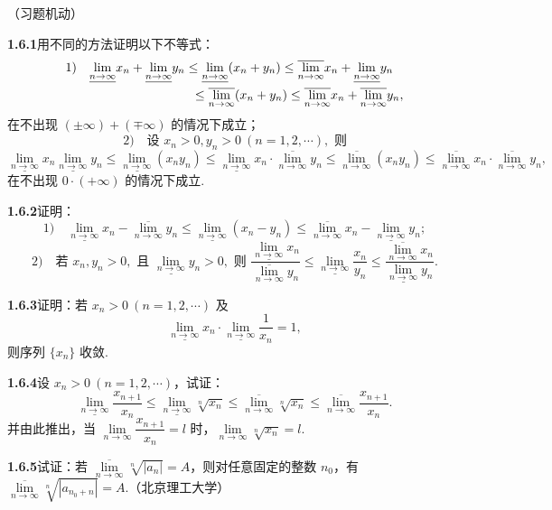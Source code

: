 \documentclass[UTF8,12pt,a4paper,fontset=fandol]{ctexart}
\begin{document}
（习题机动）

\noindent\textbf{1.6.1}\quad 用不同的方法证明以下不等式：
\[
\begin{aligned}
  &1)\quad
  \underline{\lim_{n\to\infty}}x_n+\underline{\lim_{n\to\infty}}y_n
  \le \underline{\lim_{n\to\infty}}(x_n+y_n)
  \le \overline{\lim_{n\to\infty}}x_n+\underline{\lim_{n\to\infty}}y_n\\
  &\hspace{35mm}\le \overline{\lim_{n\to\infty}}(x_n+y_n)
  \le \overline{\lim_{n\to\infty}}x_n+\overline{\lim_{n\to\infty}}y_n,
\end{aligned}
\]
在不出现 $(\pm\infty)+(\mp\infty)$ 的情况下成立；
\[
  2)\quad \text{设 }x_n>0,y_n>0\ (n=1,2,\cdots),\text{ 则}
\]
\[
  \underline{\lim_{n\to\infty}}x_n\underline{\lim_{n\to\infty}}y_n
  \le \underline{\lim_{n\to\infty}}(x_ny_n)
  \le \underline{\lim_{n\to\infty}}x_n\cdot\overline{\lim_{n\to\infty}}y_n
  \le \overline{\lim_{n\to\infty}}(x_ny_n)
  \le \overline{\lim_{n\to\infty}}x_n\cdot\overline{\lim_{n\to\infty}}y_n,
\]
在不出现 $0\cdot(+\infty)$ 的情况下成立.

\noindent\textbf{1.6.2}\quad 证明：
\[
  1)\quad
  \underline{\lim_{n\to\infty}}x_n-\overline{\lim_{n\to\infty}}y_n
  \le \underline{\lim_{n\to\infty}}(x_n-y_n)
  \le \overline{\lim_{n\to\infty}}x_n-\underline{\lim_{n\to\infty}}y_n;
\]
\[
  2)\quad \text{若 }x_n,y_n>0,\text{ 且 }\underline{\lim_{n\to\infty}}y_n>0,\text{ 则 }
  \frac{\underline{\lim\limits_{n\to\infty}}x_n}{\overline{\lim\limits_{n\to\infty}}y_n}
  \le \underline{\lim_{n\to\infty}}\frac{x_n}{y_n}
  \le \frac{\overline{\lim\limits_{n\to\infty}}x_n}{\underline{\lim\limits_{n\to\infty}}y_n}.
\]

\noindent\textbf{1.6.3}\quad 证明：若 $x_n>0\ (n=1,2,\cdots)$ 及
\[
  \underline{\lim_{n\to\infty}}x_n\cdot\underline{\lim_{n\to\infty}}\frac1{x_n}=1,
\]
则序列 $\{x_n\}$ 收敛.

\noindent\textbf{1.6.4}\quad 设 $x_n>0\ (n=1,2,\cdots)$，试证：
\[
  \underline{\lim_{n\to\infty}}\frac{x_{n+1}}{x_n}
  \le \underline{\lim_{n\to\infty}}\sqrt[n]{x_n}
  \le \overline{\lim_{n\to\infty}}\sqrt[n]{x_n}
  \le \overline{\lim_{n\to\infty}}\frac{x_{n+1}}{x_n}.
\]
并由此推出，当 $\lim\limits_{n\to\infty}\dfrac{x_{n+1}}{x_n}=l$ 时，$\lim\limits_{n\to\infty}\sqrt[n]{x_n}=l$.

\noindent\textbf{1.6.5}\quad 试证：若 $\overline{\lim\limits_{n\to\infty}}\sqrt[n]{|a_n|}=A$，则对任意固定的整数 $n_0$，有 $\overline{\lim\limits_{n\to\infty}}\sqrt[n]{|a_{n_0+n}|}=A$.（北京理工大学）
\end{document}
